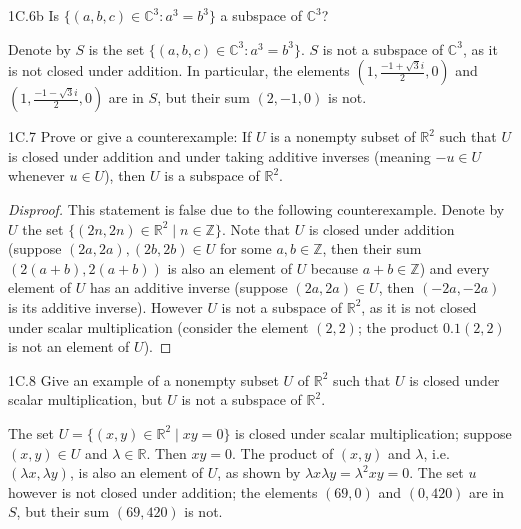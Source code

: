 \documentclass{exam}
\newcommand{\paren}[1]{\left(#1\right)}
\begin{document}
\begin{problem}{1C.6b}
    Is $\{(a, b, c)\in\mathbb C^3: a^3 = b^3\}$ a subspace of $\mathbb C^3$?
\end{problem}
Denote by $S$ is the set $\{(a, b, c)\in\mathbb C^3: a^3 = b^3\}$. $S$ is not a subspace of $\mathbb C^3$, as it is not closed under addition. In particular, the elements $\paren{1, \frac{-1+\sqrt3i}2, 0}$ and $\paren{1, \frac{-1-\sqrt3i}2, 0}$ are in $S$, but their sum $(2, -1, 0)$ is not.

\begin{problem}{1C.7}
    Prove or give a counterexample: If $U$ is a nonempty subset of $\mathbb R^2$ such that $ U$ is closed under addition and under taking additive inverses (meaning $-u\in U$ whenever $u\in U$), then $U$ is a subspace of $\mathbb R^2$.
\end{problem}

\begin{proof}[Disproof]
    This statement is false due to the following counterexample. Denote by $U$ the set $\{(2n, 2n)\in\mathbb R^2\mid n\in\mathbb Z\}$. Note that $U$ is closed under addition (suppose $(2a, 2a), (2b, 2b)\in U$ for some $a,b\in\mathbb Z$, then their sum $(2(a+b), 2(a + b))$ is also an element of $U$ because $a + b\in\mathbb Z$) and every element of $U$ has an additive inverse (suppose $(2a, 2a)\in U$, then $(-2a, -2a)$ is its additive inverse). However $U$ is not a subspace of $\mathbb R^2$, as it is not closed under scalar multiplication (consider the element $(2, 2)$; the product $0.1(2, 2)$ is not an element of $U$).
\end{proof}

\begin{problem}{1C.8}
    Give an example of a nonempty subset $U$ of $\mathbb R^2$ such that $U$ is closed under scalar multiplication, but $U$ is not a subspace of $\mathbb R^2$.
\end{problem}
The set $U = \{(x, y)\in\mathbb R^2\mid xy = 0\}$ is closed under scalar multiplication; suppose $(x, y)\in U$ and $\lambda\in\mathbb R$. Then $xy = 0$. The product of $(x, y)$ and $\lambda$, i.e. $(\lambda x, \lambda y)$, is also an element of $U$, as shown by $\lambda x\lambda y = \lambda^2xy = 0$. The set $u$ however is not closed under addition; the elements $(69, 0)$ and $(0, 420)$ are in $S$, but their sum $(69, 420)$ is not.
\end{document}

